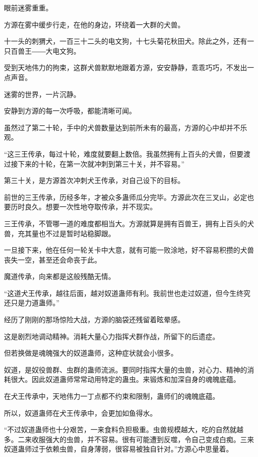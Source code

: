 
\begin{this_body}

眼前迷雾重重。

方源在雾中缓步行走，在他的身边，环绕着一大群的犬兽。

十一头的刺猬犬，一百三十二头的电文狗，十七头菊花秋田犬。除此之外，还有一只百兽王――大电文狗。

受到天地伟力的拘束，这群犬兽默默地跟着方源，安安静静，乖乖巧巧，不发出一点声音。

迷雾的世界，一片沉静。

安静到方源的每一次呼吸，都能清晰可闻。

虽然过了第二十轮，手中的犬兽数量达到前所未有的最高，方源的心中却并不乐观。

“这三王传承，每过十轮，难度就要翻上数倍。我虽然拥有上百头的犬兽，但要渡过接下来的十轮，在第一次就冲刺到第三十关，并不容易。”

第三十关，是方源首次冲刺犬王传承，对自己设下的目标。

前世的三王传承，历经多年，才被众多蛊师瓜分完毕。方源此次在三叉山，必定也要历时良久。想要一次性地夺取传承，并不现实。

三王传承，不管哪一道的难度都相当大。方源就算是拥有百兽王，拥有上百头的犬兽，充其量也不过是暂时站稳脚跟。

一旦接下来，他在任何一轮关卡中大意，就有可能一败涂地，好不容易积攒的犬兽丧失一空，甚至还会命丧于此。

魔道传承，向来都是这般残酷无情。

“这道犬王传承，越往后面，越对奴道蛊师有利。我前世也走过奴道，但今生终究还只是力道蛊师。”

经历了刚刚的那场惊险大战，方源的脑袋还残留着眩晕感。

这是剧烈地调动精神。消耗大量心力指挥犬群作战，所留下的后遗症。

但若换做是魂魄强大的奴道蛊师，这种症状就会小很多。

奴道，是奴役兽群、虫群的蛊师流派。要同时指挥大量的虫兽，对心力、精神的消耗很大。因此奴道蛊师常常动用特定的蛊虫。来锻炼和加深自身的魂魄底蕴。

在犬王传承中，天地伟力一丁点都不约束和限制，蛊师们的魂魄底蕴。

所以，奴道蛊师在犬王传承中，会更加如鱼得水。

“不过奴道蛊师也十分艰苦，一来食料负担极重。虫兽规模越大，吃的自然就越多。二来收服强大的虫兽，并不容易。很有可能遭到反噬，令自己变成白痴。三来奴道蛊师过于依赖虫兽，自身薄弱，很容易被独自针对。”方源心中思量着。


\end{this_body}
